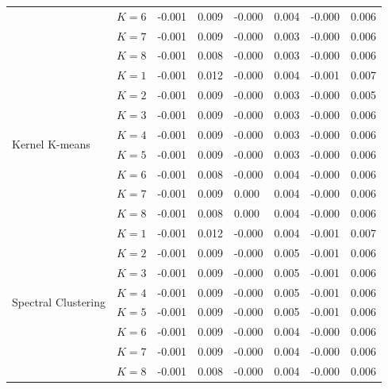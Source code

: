 \begin{table}[!t]
\begin{tabular}{l|c|ll|ll|ll}
     & $K=6$ & -0.001 & 0.009 & -0.000 & 0.004 & -0.000 & 0.006 \\
     & $K=7$ & -0.001 & 0.009 & -0.000 & 0.003 & -0.000 & 0.006 \\
     & $K=8$ & -0.001 & 0.008 & -0.000 & 0.003 & -0.000 & 0.006 \\
    \midrule
    \multirow[t]{8}{*}{Kernel K-means} & $K=1$ & -0.001 & 0.012 & -0.000 & 0.004 & -0.001 & 0.007 \\
     & $K=2$ & -0.001 & 0.009 & -0.000 & 0.003 & -0.000 & 0.005 \\
     & $K=3$ & -0.001 & 0.009 & -0.000 & 0.003 & -0.000 & 0.006 \\
     & $K=4$ & -0.001 & 0.009 & -0.000 & 0.003 & -0.000 & 0.006 \\
     & $K=5$ & -0.001 & 0.009 & -0.000 & 0.003 & -0.000 & 0.006 \\
     & $K=6$ & -0.001 & 0.008 & -0.000 & 0.004 & -0.000 & 0.006 \\
     & $K=7$ & -0.001 & 0.009 &  0.000 & 0.004 & -0.000 & 0.006 \\
     & $K=8$ & -0.001 & 0.008 &  0.000 & 0.004 & -0.000 & 0.006 \\
    \midrule
    \multirow[t]{8}{*}{Spectral Clustering} & $K=1$ & -0.001 & 0.012 & -0.000 & 0.004 & -0.001 & 0.007 \\
     & $K=2$ & -0.001 & 0.009 & -0.000 & 0.005 & -0.001 & 0.006 \\
     & $K=3$ & -0.001 & 0.009 & -0.000 & 0.005 & -0.001 & 0.006 \\
     & $K=4$ & -0.001 & 0.009 & -0.000 & 0.005 & -0.001 & 0.006 \\
     & $K=5$ & -0.001 & 0.009 & -0.000 & 0.005 & -0.001 & 0.006 \\
     & $K=6$ & -0.001 & 0.009 & -0.000 & 0.004 & -0.000 & 0.006 \\
     & $K=7$ & -0.001 & 0.009 & -0.000 & 0.004 & -0.000 & 0.006 \\
     & $K=8$ & -0.001 & 0.008 & -0.000 & 0.004 & -0.000 & 0.006 \\
    \midrule
    \end{tabular}
\end{table}

